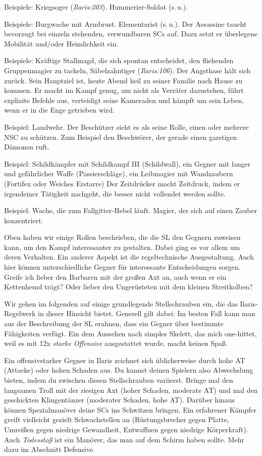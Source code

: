 Beispiele: Kriegsoger (\textit{Ilaris:203}). Hummerier-Soldat (s.\,u.). 

Beispiele: Burgwache mit Armbrust. Elementarist (s.\,u.).
Der Assassine taucht bevorzugt bei einzeln stehenden, verwundbaren SCs auf.
Dazu setzt er überlegene Mobilität und/oder Heimlichkeit ein.

Beispiele: Kräftige Stallmagd, die sich spontan entscheidet, den fliehenden Gruppenmagier zu tackeln, Säbelzahntiger (\textit{Ilaris:106}).
Der Angsthase hält sich zurück. Sein Hauptziel ist, heute Abend heil zu seiner Familie nach Hause zu kommen.
Er macht im Kampf genug, um nicht als Verräter dazustehen, führt explizite Befehle aus, verteidigt seine Kameraden und kämpft um sein Leben, wenn er in die Enge getrieben wird.

Beispiel: Landwehr.
Der Beschützer sieht es als seine Rolle, einen oder mehrere NSC zu schützen.
Zum Beispiel den Beschwörer, der gerade einen garstigen Dämonen ruft.

Beispiel: Schildkämpfer mit Schildkampf III (Schildwall), ein Gegner mit langer und gefährlicher Waffe (Passierschläge), ein Leibmagier mit Wandzaubern (Fortifex oder Weiches Erstarre)
Der Zeitdrücker macht Zeitdruck, indem er irgendeiner Tätigkeit nachgeht, die besser nicht vollendet werden sollte.

Beispiel: Wache, die zum Fallgitter-Hebel läuft. Magier, der sich auf einen Zauber konzentriert.

Oben haben wir einige Rollen beschrieben, die die SL den Gegnern zuweisen kann, um den Kampf interessanter zu gestalten.
Dabei ging es vor allem um deren Verhalten. Ein anderer Aspekt ist die regeltechnische Ausgestaltung.
Auch hier können unterschiedliche Gegner für interessante Entscheidungen sorgen.
Greife ich lieber den Barbaren mit der großen Axt an, auch wenn er ein Kettenhemd trägt?
Oder lieber den Ungerüsteten mit dem kleinen Streitkolben?

Wir gehen im folgenden auf einige grundlegende Stellschrauben ein, die das Ilaris-Regelwerk in dieser Hinsicht bietet.
Generell gilt dabei: Im besten Fall kann man aus der Beschreibung der SL erahnen, dass ein Gegner über bestimmte Fähigkeiten verfügt.
Ein dem Aussehen nach simples Skelett, das mich one-hittet, weil es mit 12x \emph{starke Offensive} ausgestattet wurde, macht keinen Spaß.

Ein offensivstarker Gegner in Ilaris zeichnet sich üblicherweise durch hohe AT (Attacke) oder hohen Schaden aus.
Du kannst deinen Spielern also Abwechslung bieten, indem du zwischen diesen Stellschrauben variierst. 
Bringe mal den langsamen Troll mit der riesigen Axt (hoher Schaden, moderate AT) und mal den geschickten Klingentänzer (moderater Schaden, hohe AT).
Darüber hinaus können Spezialmanöver deine SCs ins Schwitzen bringen. Ein erfahrener Kämpfer greift vielleicht gezielt Schwachstellen an (Rüstungsbrecher gegen Platte, Umreißen gegen niedrige Gewandheit, Entwaffnen gegen niedrige Körperkraft).
Auch \textit{Todesstoß} ist ein Manöver, das man auf dem Schirm haben sollte. Mehr dazu im Abschnitt Defensive. 

